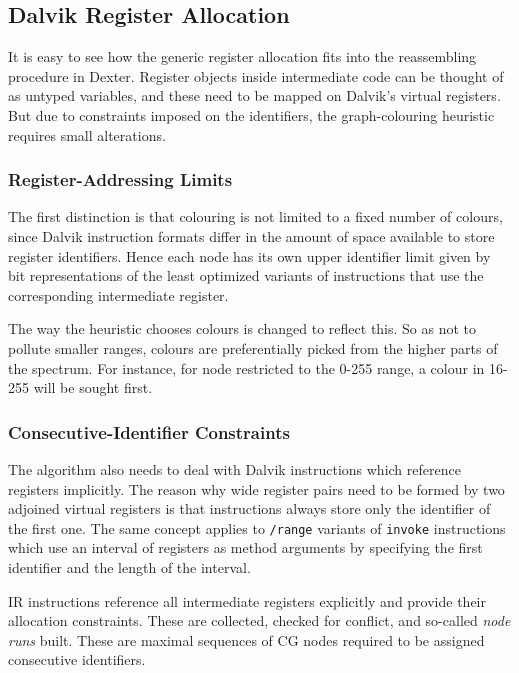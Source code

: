 \documentclass[12pt,twoside,notitlepage]{report}
\begin{document}
\subsection{Dalvik Register Allocation}

It is easy to see how the generic register allocation fits into the reassembling procedure in Dexter. Register objects inside intermediate code can be thought of as untyped variables, and these need to be mapped on Dalvik's virtual registers. But due to constraints imposed on the identifiers, the graph-colouring heuristic requires small alterations.

\subsubsection{Register-Addressing Limits}

The first distinction is that colouring is not limited to a fixed number of colours, since Dalvik instruction formats differ in the amount of space available to store register identifiers. Hence each node has its own upper identifier limit given by bit representations of the least optimized variants of instructions that use the corresponding intermediate register.

The way the heuristic chooses colours is changed to reflect this. So as not to pollute smaller ranges, colours are preferentially picked from the higher parts of the spectrum. For instance, for node restricted to the \mbox{0-255} range, a colour in \mbox{16-255} will be sought first.

\subsubsection{Consecutive-Identifier Constraints}

The algorithm also needs to deal with Dalvik instructions which reference registers implicitly. The reason why wide register pairs need to be formed by two adjoined virtual registers is that instructions always store only the identifier of the first one. The same concept applies to \verb$/range$ variants of \verb$invoke$ instructions which use an interval of registers as method arguments by specifying the first identifier and the length of the interval.

IR instructions reference all intermediate registers explicitly and provide their allocation constraints. These are collected, checked for conflict, and so-called \emph{node runs} built. These are maximal sequences of CG nodes required to be assigned consecutive identifiers. 
\end{document}
